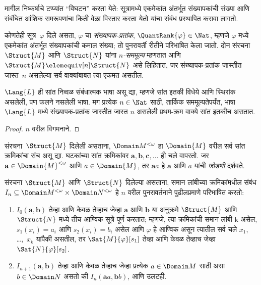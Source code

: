 मागील निष्कर्षाचे टप्प्यांत ``विघटन'' करता येते: सूत्रामध्ये
एकमेकांत अंतर्भूत संख्यापकांची संख्या आणि संबंधित आंशिक समरूपणांचा
किती वेळा विस्तार करता येतो यांचा संबंध प्रस्थापित करावा लागतो.

\begin{defn}
  कोणतेही सूत्र~$\varphi$ दिले असता, $\varphi$ चा
  \emph{संख्यापक-प्रतांक}, $\QuantRank{\varphi} \in \Nat$, म्हणजे $\varphi$ मध्ये एकमेकांत अंतर्भूत
  संख्यापकांची कमाल संख्या; तो पुनरावर्ती रीतीने परिभाषित केला जातो.
  दोन संरचना $\Struct{M}$ आणि $\Struct{N}$ यांना
  \emph{$n$-सममूल्य} म्हणतात आणि $\Struct{M} \elemequiv[n] \Struct{N}$
  असे लिहितात, जर संख्यापक-प्रतांक जास्तीत जास्त~$n$ असलेल्या सर्व
  वाक्यांबाबत त्या एकमत असतील.
\end{defn}

\begin{prop}\label{mod:bas:pis:prop:qr-finite}
  $\Lang{L}$ ही सांत निव्वळ संबंधात्मक भाषा असू द्या, म्हणजे
  सांत इतकी विधेये आणि स्थिरांक असलेली, पण फलने
  नसलेली भाषा. मग प्रत्येक $n \in \Nat$ साठी, तार्किक
  सममूल्यतेपर्यंत, भाषा $\Lang{L}$ मध्ये संख्यापक-प्रतांक
  जास्तीत जास्त $n$ असलेली प्रथम-क्रम वाक्ये सांत इतकीच असतात.
\end{prop}

\begin{proof}
  $n$ वरील विगमनाने.
\end{proof}

\begin{defn}
  संरचना~$\Struct{M}$ दिलेली असताना, $\Domain M^{<\omega}$ हा
  $\Domain{M}$ वरील सर्व सांत क्रमिकांचा संच असू द्या. घटकांच्या सांत
  क्रमिकांवर $\mathbf{a}, \mathbf{b}, \mathbf{c}, \ldots$ ही चले वापरतो.
  जर $\mathbf{a} \in \Domain{M}^{<\omega}$ आणि $a \in \Domain{M}$,
  तर $\mathbf{a}a$ हे $\mathbf{a}$ आणि $a$ यांची \emph{जोडणी} दर्शवते.
\end{defn}

\begin{defn}
  संरचना $\Struct{M}$ आणि $\Struct{N}$ दिलेल्या असताना, समान
  लांबीच्या क्रमिकांमधील संबंध $I_n \subseteq \Domain M^{<\omega}
  \times \Domain N^{<\omega}$ हे $n$ वरील पुनरावर्तनाने पुढीलप्रमाणे
  परिभाषित करतो:
   \begin{enumerate}
   \item $I_0(\mathbf{a},\mathbf{b})$ तेव्हा आणि केवळ तेव्हाच जेव्हा
     $\mathbf{a}$ आणि $\mathbf{b}$ या अनुक्रमे $\Struct{M}$ आणि
     $\Struct{N}$ मध्ये तीच आण्विक सूत्रे पूर्ण करतात; म्हणजे,
     त्या क्रमिकांची समान लांबी k असेल, $s_1(x_i) = a_i$ आणि $s_2(x_i) =
     b_i$ असेल आणि $\varphi$ हे आण्विक असून त्यातील सर्व चले
     $x_1$, \dots,~$x_k$ यांपैकी असतील, तर $\Sat{M}{\varphi}[s_1]$ तेव्हा आणि
     केवळ तेव्हाच जेव्हा~$\Sat{N}{\varphi}[s_2]$.

   \item $I_{n+1} (\mathbf{a},\mathbf{b})$ तेव्हा आणि केवळ तेव्हाच
     जेव्हा प्रत्येक $a\in \Domain M$ साठी असा $b\in \Domain N$ असतो की
     $I_n (\mathbf{a}a,\mathbf{b}b)$, आणि उलटही.
   \end{enumerate}
\end{defn}


